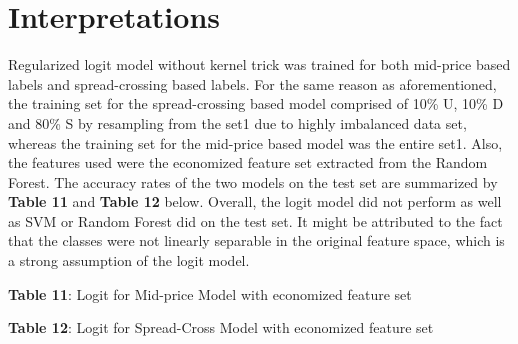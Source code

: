 \documentclass[11pt]{article}
\begin{document}
\section{Interpretations}
Regularized logit model without kernel trick was trained for both mid-price based labels and spread-crossing based labels. For the same reason as aforementioned, the training set for the spread-crossing based model comprised of 10\% U, 10\% D and 80\% S by resampling from the set1 due to highly imbalanced data set, whereas the training set for the mid-price based model was the entire set1. Also, the features used were the economized feature set extracted from the Random Forest. The accuracy rates of the two models on the test set are summarized by \textbf{Table 11} and \textbf{Table 12} below. Overall, the logit model did not perform as well as SVM or Random Forest did on the test set. It might be attributed to the fact that the classes were not linearly separable in the original feature space, which is a strong assumption of the logit model.
\begin{multicols}{2}
\begin{center}
\renewcommand{\arraystretch}{1.4}

\vspace{0.5 cm}
\small \textbf{Table 11}: Logit for Mid-price Model with economized feature set
\end{center}

\begin{center}
\renewcommand{\arraystretch}{1.4}

\vspace{0.5 cm}
\small \textbf{Table 12}: Logit for Spread-Cross Model with economized feature set
\end{center}
\end{multicols}
\end{document}

